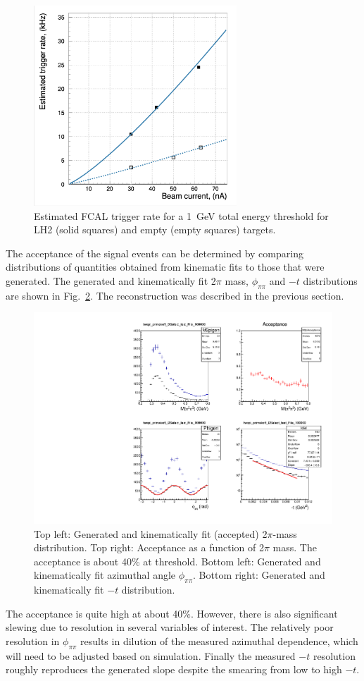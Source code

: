 \begin{figure}[tbh]
\centering
\includegraphics[width=3in]{figures/fcalrate_vs_beam.png}
\caption{Estimated FCAL trigger rate for a 1~GeV
  total energy threshold for LH2 (solid squares) and empty
  (empty squares) targets.
\label{fig:fcalrate}}
\end{figure}

The acceptance of the signal events can be determined by comparing
distributions of quantities obtained from kinematic fits to those
that were generated. The generated and
kinematically fit 2$\pi$ mass, $\phi_{\pi\pi}$ and $-t$ distributions
are shown in
Fig.~\ref{fig:twopi_primakoff_DSelect_p1_W_100000_sum}. The
reconstruction was described in the previous section.
\begin{figure}[tph]
\centering
\includegraphics[width=6in]{figures/twopi_primakoff_DSelect_test_File_100000_sum_PrimNC.pdf}
\caption{Top left: Generated and kinematically fit (accepted)
  2$\pi$-mass distribution. Top right: Acceptance as a function of
  2$\pi$ mass. The acceptance is about 40\% at threshold. Bottom left:
  Generated and kinematically fit azimuthal angle
  $\phi_{\pi\pi}$. Bottom right: Generated and kinematically fit $-t$
  distribution.}
\label{fig:twopi_primakoff_DSelect_p1_W_100000_sum}
\end{figure}
The acceptance is quite high at about 40\%. However, there is also
significant slewing due to resolution in several variables of
interest.  The
relatively poor resolution in $\phi_{\pi\pi}$ results in dilution of
the measured azimuthal dependence, which will need to be adjusted
based on simulation. Finally the measured $-t$ resolution roughly
reproduces the generated slope despite the smearing 
from low to high $-t$.